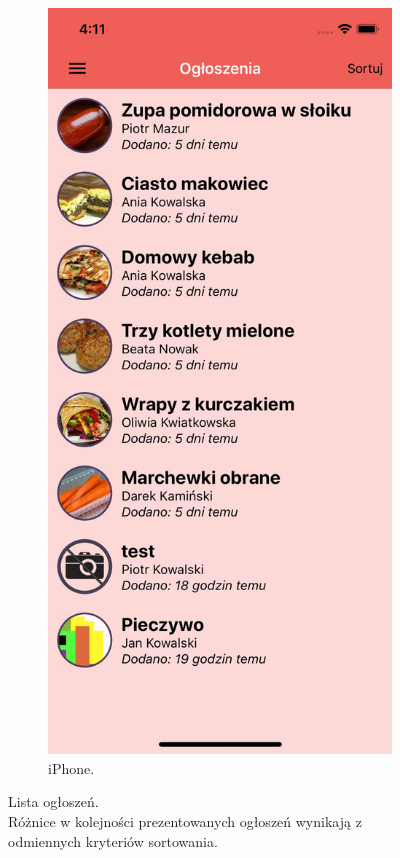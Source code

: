 \documentclass[licencjacka]{pracamgr}
\begin{document}
\begin{figure}[h!]
\begin{subfigure}[b]{0.4\linewidth}
\begin{framed}
      \includegraphics[width=\linewidth]{ios1.jpg}
    \end{framed}
    \caption{iPhone.}
  \end{subfigure}
  \captionsetup{justification=centering}
  \caption{Lista ogłoszeń.\\
  Różnice w kolejności prezentowanych ogłoszeń wynikają z odmiennych kryteriów sortowania.}
  \label{fig:offers}
\end{figure}
\end{document}
